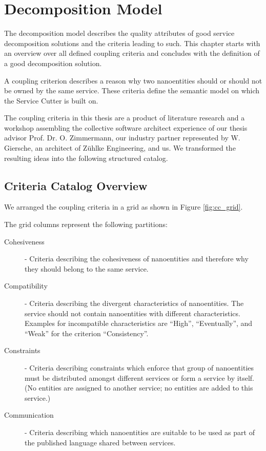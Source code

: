 \chapter{Decomposition Model}
\label{cha:decomposition}

The decomposition model describes the quality attributes of good service decomposition solutions and the criteria leading to such. This chapter starts with an overview over all defined coupling criteria and concludes with the definition of a good decomposition solution. 

A coupling criterion describes a reason why two nanoentities should or should not be owned by the same service. These criteria define the semantic model on which the Service Cutter is built on. 

The coupling criteria in this thesis are a product of literature research and a workshop assembling the collective software architect experience of our thesis advisor Prof. Dr. O. Zimmermann, our industry partner represented by W. Giersche, an architect of Zühlke Engineering, and us. We transformed the resulting ideas into the following structured catalog.

\section{Criteria Catalog Overview}
\label{subsec:couplingCriteriaOverview}

We arranged the coupling criteria in a grid as shown in Figure \ref{fig:cc_grid}.

The grid columns represent the following partitions:

\begin{description}
	\item[Cohesiveness] - Criteria describing the cohesiveness of nanoentities and therefore why they should belong to the same service. 
	\item[Compatibility] - Criteria describing the divergent characteristics of nanoentities. The service should not contain nanoentities with different characteristics. Examples for incompatible characteristics are \enquote{High}, \enquote{Eventually}, and \enquote{Weak} for the criterion \enquote{Consistency}.
	\item[Constraints] - Criteria describing constraints which enforce that group of nanoentities must be distributed amongst different services or form a service by itself. (No entities are assigned to another service; no entities are added to this service.)
	\item[Communication] - Criteria describing which nanoentities are suitable to be used as part of the published language shared between services. 
\end{description}

